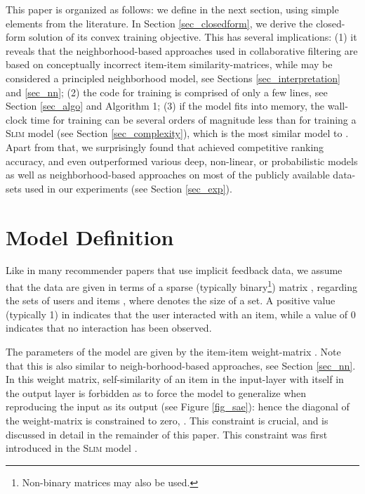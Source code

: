 \documentclass[sigconf]{acmart}
\newcommand{\slim}{{\scshape Slim}}
\newcommand{\sae}{}
\begin{document}
This paper is organized as follows: we define \sae{}  in the next section, using simple elements from the literature. In Section \ref{sec_closedform}, we derive the closed-form solution of its convex training objective. This has several implications:  (1) it reveals that the neighborhood-based approaches used in collaborative filtering are based on conceptually incorrect item-item similarity-matrices, while \sae{}  may be considered  a principled neighborhood model, see Sections \ref{sec_interpretation} and \ref{sec_nn};
(2) the code for training \sae{}  is comprised of only a few lines, see Section \ref{sec_algo} and Algorithm 1; (3) if the model fits into memory, the wall-clock time for training \sae{}  can be   several  orders of magnitude less than  for training a \slim{}  \cite{ning11} model (see Section \ref{sec_complexity}), which is the most similar model to \sae{}.
Apart from that, we surprisingly found that \sae{}   achieved competitive ranking accuracy, and even outperformed  various deep, non-linear, or probabilistic models as well as neighborhood-based approaches on most of the publicly available data-sets used in our experiments (see Section \ref{sec_exp}).



\section{Model Definition}
Like in many recommender papers that use implicit feedback data,
we assume that the  data are given in terms of a sparse (typically binary\footnote{Non-binary matrices may also be used.})  matrix , regarding the sets of users  and items , where  denotes the size of a set. A positive value (typically 1) in  indicates that the user interacted with an item, while a value of 0 indicates that no interaction has been observed.

The parameters of the \sae{}  model are given by the item-item  weight-matrix . Note that this is also similar to neigh-borhood-based approaches, see Section \ref{sec_nn}. In this weight matrix, self-similarity of an item in the input-layer with itself in the output layer is forbidden as to force the model to generalize when reproducing  the input as its output (see Figure \ref{fig_sae}): 
hence   the  diagonal of the weight-matrix is constrained to zero, . This constraint is crucial, and is discussed in detail in the remainder of this paper. This constraint was first introduced in the \slim{} model  \cite{ning11}.
\end{document}
